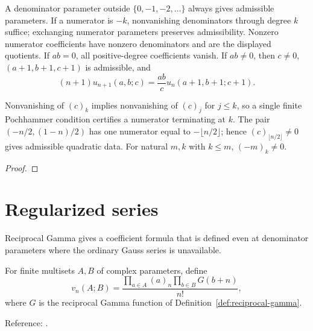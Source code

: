 \begin{supporting}

\begin{theorem}
\label{thm:gauss-coefficients}
\leanok
A denominator parameter outside $\{0,-1,-2,\ldots\}$ always gives admissible
parameters. If a numerator is $-k$, nonvanishing denominators through degree $k$
suffice; exchanging numerator parameters preserves admissibility. Nonzero
numerator coefficients have nonzero denominators and are the displayed quotients.
If $ab=0$, all positive-degree coefficients vanish. If $ab\ne0$, then $c\ne0$,
$(a+1,b+1,c+1)$ is admissible, and
\[
 (n+1)u_{n+1}(a,b;c)=\frac{ab}{c}u_n(a+1,b+1;c+1).
\]

Nonvanishing of $(c)_k$ implies nonvanishing of $(c)_j$ for $j\le k$, so a
single finite Pochhammer condition certifies a numerator terminating at $k$.
The pair $(-n/2,(1-n)/2)$ has one numerator equal to $-\lfloor n/2\rfloor$;
hence $(c)_{\lfloor n/2\rfloor}\ne0$ gives admissible quadratic data.
For natural $m,k$ with $k\le m$, $(-m)_k\ne0$.
\end{theorem}
\begin{proof}
\leanok
\end{proof}

\end{supporting}

\section{Regularized series}\label{sec:textbook-special-functions-regularized}

Reciprocal Gamma gives a coefficient formula that is defined even at denominator parameters where the ordinary Gauss series is unavailable.

\begin{definition}
\label{def:regularized-hypergeometric-coefficients}
\leanok
For finite multisets $A,B$ of complex parameters, define
\[
 v_n(A;B)=\frac{\prod_{a\in A}(a)_n\prod_{b\in B}G(b+n)}{n!},
\]
where $G$ is the reciprocal Gamma function of
Definition~\ref{def:reciprocal-gamma}.

Reference: \cite[15.2.2, 16.2]{dlmf}.
\end{definition}

